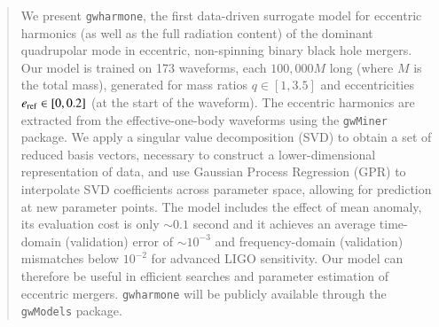 \documentclass[aps,prd,amsmath,floats,floatfix, twocolumn,
superscriptaddress,nofootinbib,showpacs,longbibliography]{revtex4-1}
\begin{document}
\begin{abstract}
We present \texttt{gwharmone}, the first data-driven surrogate model for eccentric harmonics (as well as the full radiation content) of the dominant quadrupolar mode in eccentric, non-spinning binary black hole mergers.  
Our model is trained on 173 waveforms, each $100,000M$ long (where $M$ is the total mass), generated for mass ratios $q \in [1,3.5]$ and eccentricities $e_{\rm ref} \in [0,0.2]$ (at the start of the waveform). The eccentric harmonics are extracted from the effective-one-body waveforms using the \texttt{gwMiner} package.  
We apply a singular value decomposition (SVD) to obtain a set of reduced basis vectors, necessary to construct a lower-dimensional representation of data, and use Gaussian Process Regression (GPR) to interpolate SVD coefficients across parameter space, allowing for prediction at new parameter points. 
The model includes the effect of mean anomaly, its evaluation cost is only $\sim 0.1$ second and it achieves an average time-domain (validation) error of $\sim 10^{-3}$ and frequency-domain (validation) mismatches below $10^{-2}$ for advanced LIGO sensitivity. Our model can therefore be useful in efficient searches and parameter estimation of eccentric mergers. \texttt{gwharmone} will be publicly available through the \texttt{gwModels} package. \href{https://github.com/tousifislam/gwModels}{\faGithub}
\end{abstract}
\maketitle
\end{document}

